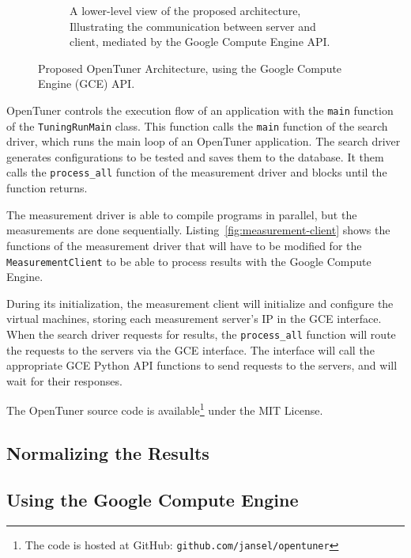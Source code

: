 \documentclass[a4paper, 12pt]{article}
\begin{document}
\begin{figure}[htpb]
\begin{subfigure}{.45\textwidth}
        \caption{A lower-level view of the proposed architecture,
        Illustrating the communication between server and client,
        mediated by the Google Compute Engine API.
        }
        \label{fig:low-level}
    \end{subfigure}%
    \caption{Proposed OpenTuner Architecture,
    using the Google Compute Engine (GCE) API.}
    \label{fig:archs}
\end{figure}

OpenTuner controls the execution flow of an application
with the \texttt{\footnotesize main} function of the 
\texttt{\footnotesize TuningRunMain} class. This function
calls the \texttt{\footnotesize main} function of the
search driver, which runs the main loop of an OpenTuner
application. The search driver generates configurations
to be tested and saves them to the database. It them calls
the \texttt{\footnotesize process\_all} function of the
measurement driver and blocks until the function returns.

The measurement driver is able to compile programs in parallel,
but the measurements are done sequentially.
Listing~\ref{fig:measurement-client} shows the functions of
the measurement driver that will have to be modified for the
\texttt{\footnotesize MeasurementClient} to be able to
process results with the Google Compute Engine.

During its initialization, the measurement client will
initialize and configure the virtual machines, storing
each measurement server's IP in the GCE interface. 
When the search driver requests for results, 
the \texttt{\footnotesize process\_all} function will route 
the requests to the servers via the GCE interface.
The interface will call the appropriate GCE Python API
functions to send requests to the servers, and will wait
for their responses.

The OpenTuner source code is
available\footnote{The code is hosted at GitHub:
\texttt{\scriptsize github.com/jansel/opentuner}} under
the MIT License.



\subsection{Normalizing the Results}

\subsection{Using the Google Compute Engine} \label{sec:pwork}
\end{document}
